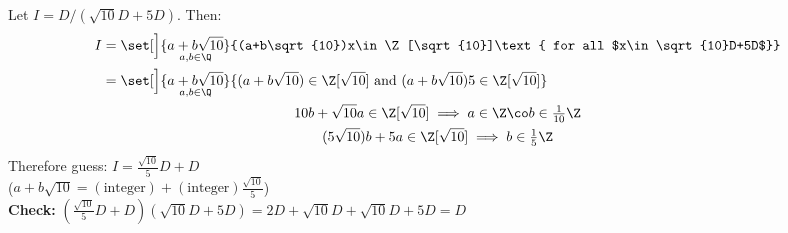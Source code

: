 Let $I=D/(\sqrt{10}D+5D)$.  Then:
\begin{gather*}
\begin{aligned}
I &= \set[\Big]{\underset{a,b\in\Q}{a+b\sqrt{10}}}{(a+b\sqrt{10})x\in\Z[\sqrt{10}]\text{ for all $x\in\sqrt{10}D+5D$}} \\
&= \set[\Big]{\underset{a,b\in\Q}{a+b\sqrt{10}}}{(a+b\sqrt{10})\in\Z[\sqrt{10}]\text{ and }(a+b\sqrt{10})5\in\Z[\sqrt{10}]} \\
\end{aligned} \\
10b+\sqrt{10}a \in \Z[\sqrt{10}] \implies a\in\Z \co b\in\tfrac1{10}\Z \\
(5\sqrt{10})b + 5a \in \Z[\sqrt{10}] \implies b\in\tfrac15\Z
\end{gather*}
Therefore guess: $I=\frac{\sqrt{10}}{5}D+D$ \\
($a+b\sqrt{10}=(\text{integer})+(\text{integer})\frac{\sqrt{10}}{5}$) \\
\textbf{Check:} $(\frac{\sqrt{10}}{5}D+D)(\sqrt{10}D+5D)=2D+\sqrt{10}D+\sqrt{10}D+5D=D$
